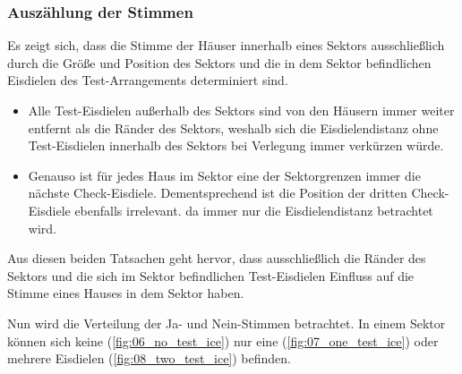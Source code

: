 \documentclass[a4paper,10pt,ngerman,captions=figureheading]{scrartcl}
\begin{document}
\subsubsection{Auszählung der Stimmen}
\label{sec:Auszählung_der_Stimmen}
Es zeigt sich, dass die Stimme der Häuser innerhalb eines Sektors ausschließlich durch die Größe und Position des Sektors und die in dem Sektor befindlichen Eisdielen des Test-Arrangements determiniert sind.
\begin{itemize}
    \item Alle Test-Eisdielen außerhalb des Sektors sind von den Häusern immer weiter entfernt als die Ränder des Sektors, weshalb sich die Eisdielendistanz ohne Test-Eisdielen innerhalb des Sektors bei Verlegung immer verkürzen würde.
    \item Genauso ist für jedes Haus im Sektor eine der Sektorgrenzen immer die nächste Check-Eisdiele.
          Dementsprechend ist die Position der dritten Check-Eisdiele ebenfalls irrelevant. da immer nur die Eisdielendistanz betrachtet wird.
\end{itemize}
Aus diesen beiden Tatsachen geht hervor, dass ausschließlich die Ränder des Sektors und die sich im Sektor befindlichen Test-Eisdielen Einfluss auf die Stimme eines Hauses in dem Sektor haben.

\medskip
Nun wird die Verteilung der Ja- und Nein-Stimmen betrachtet.
In einem Sektor können sich keine (\autoref{fig:06_no_test_ice}) nur eine (\autoref{fig:07_one_test_ice}) oder mehrere Eisdielen (\autoref{fig:08_two_test_ice}) befinden.
\end{document}
